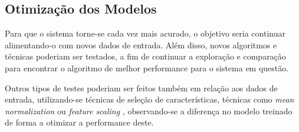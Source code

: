 		\subsection{Otimização dos Modelos}

			Para que o sistema torne-se cada vez mais acurado, o objetivo seria continuar alimentando-o com novos dados de entrada. Além disso, novos algoritmos e técnicas poderiam ser testados, a fim de continuar a exploração e comparação para encontrar o algoritmo de melhor performance para o sistema em questão.

			Outros tipos de testes poderiam ser feitos também em relação aos dados de entrada, utilizando-se técnicas de seleção de características, técnicas como \emph{mean normalization} ou \emph{feature scaling} \cite{Coursera}, observando-se a diferença no modelo treinado de forma a otimizar a performance deste.
